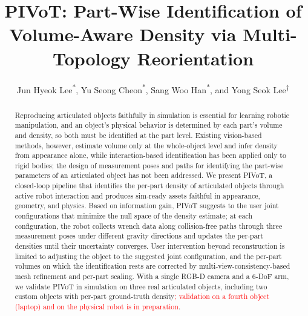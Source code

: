 \documentclass[conference]{IEEEtran}
\newcommand{\rev}[1]{\textcolor{red}{#1}}
\begin{document}
\title{PIVoT: Part-Wise Identification of Volume-Aware Density via Multi-Topology Reorientation}


\author{Jun Hyeok Lee\textsuperscript{*}, Yu Seong Cheon\textsuperscript{*}, Sang Woo Han\textsuperscript{*}, and Yong Seok Lee\textsuperscript{$\dagger$}}

\maketitle

\begin{abstract}
Reproducing articulated objects faithfully in simulation is essential for learning robotic manipulation, and an object's physical behavior is determined by each part's volume and density, so both must be identified at the part level. Existing vision-based methods, however, estimate volume only at the whole-object level and infer density from appearance alone, while interaction-based identification has been applied only to rigid bodies; the design of measurement poses and paths for identifying the part-wise parameters of an articulated object has not been addressed. We present PIVoT, a closed-loop pipeline that identifies the per-part density of articulated objects through active robot interaction and produces sim-ready assets faithful in appearance, geometry, and physics. Based on information gain, PIVoT suggests to the user joint configurations that minimize the null space of the density estimate; at each configuration, the robot collects wrench data along collision-free paths through three measurement poses under different gravity directions and updates the per-part densities until their uncertainty converges. User intervention beyond reconstruction is limited to adjusting the object to the suggested joint configuration, and the per-part volumes on which the identification rests are corrected by multi-view-consistency-based mesh refinement and per-part scaling. With a single RGB-D camera and a 6-DoF arm, we validate PIVoT in simulation on three real articulated objects, including two custom objects with per-part ground-truth density\rev{; validation on a fourth object (laptop) and on the physical robot is in preparation}.

\end{abstract}
\end{document}
